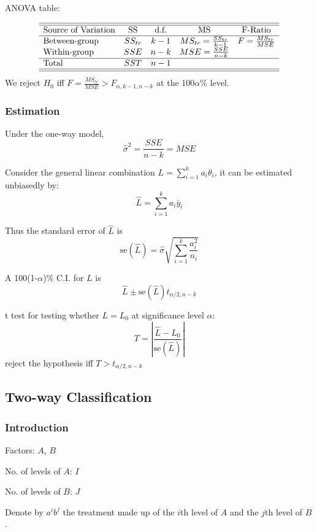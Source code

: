 \documentclass[11pt,a4paper]{article}
\begin{document}
ANOVA table: \par
\[
\begin{array}{lcccc}
    \hline\hline
    \text{Source of Variation} & \text{SS} & \text{d.f.} & \text{MS} & \text{F-Ratio} \\
    \hline
    \text{Between-group} & SS_{tr} & k-1 & MS_{tr} = \frac{SS_{tr}}{k-1} & F = \frac{MS_{tr}}{MSE} \\
    \text{Within-group} & SSE & n-k & MSE = \frac{SSE}{n-k} & \\
    \hline
    \text{Total} & SST & n-1 & & \\
    \hline\hline
\end{array}
\]
We reject $H_0$ iff $F = \frac{MS_{tr}}{MSE} > F_{\alpha, k-1, n-k}$ at the $100\alpha\%$ level.

\subsubsection{Estimation}
Under the one-way model,
\[
\hat{\sigma}^2 = \frac{SSE}{n-k} = MSE
\]

Consider the general linear combination $L = \sum_{i=1}^{k} a_i \theta_i$, it can be estimated unbiasedly by:
\[
\hat{L} = \sum_{i=1}^{k} a_i \bar{y}_i
\]

Thus the standard error of $\hat{L}$ is
\[
\text{se}(\hat{L}) = \hat{\sigma} \sqrt{\sum_{i=1}^{k} \frac{a_i^2}{n_i}}
\]

A 100(1-$\alpha$)\% C.I. for $L$ is
\[
\hat{L} \pm \text{se}(\hat{L}) t_{\alpha/2, n-k}
\]

t test for testing whether $L = L_0$ at significance level $\alpha$:
\[
T = \left| \frac{\hat{L} - L_0}{\text{se}(\hat{L})} \right|
\]
reject the hypothesis iff $T > t_{\alpha/2, n-k}$ \par

\subsection{Two-way Classification}
\subsubsection{Introduction}
Factors: $A$, $B$ \par
No. of levels of $A$: $I$ \par
No. of levels of $B$: $J$ \par
Denote by $a^ib^j$ the treatment made up of the $i$th level of $A$ and the $j$th level of $B$. \par
\end{document}

